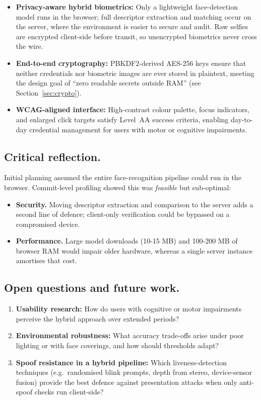\begin{itemize}
  \item \textbf{Privacy-aware hybrid biometrics:} Only a lightweight face-detection model runs in the browser; full descriptor extraction and matching occur on the server, where the environment is easier to secure and audit. Raw selfies are encrypted client-side before transit, so unencrypted biometrics never cross the wire.
  \item \textbf{End-to-end cryptography:} PBKDF2-derived AES-256 keys ensure that neither credentials nor biometric images are ever stored in plaintext, meeting the design goal of ``zero readable secrets outside RAM'' (see Section~\ref{sec:crypto}).
  \item \textbf{WCAG-aligned interface:} High-contrast colour palette, focus indicators, and enlarged click targets satisfy Level~AA success criteria, enabling day-to-day credential management for users with motor or cognitive impairments.
\end{itemize}

\subsection{Critical reflection.}
Initial planning assumed the entire face-recognition pipeline could run in the browser. Commit-level profiling showed this was \emph{feasible} but sub-optimal:  
\begin{itemize}
  \item \textbf{Security.} Moving descriptor extraction and comparison to the server adds a second line of defence; client-only verification could be bypassed on a compromised device.
  \item \textbf{Performance.} Large model downloads (10-15 MB) and 100-200 MB of browser RAM would impair older hardware, whereas a single server instance amortises that cost.
\end{itemize}


\subsection{Open questions and future work.}
\begin{enumerate}
  \item \textbf{Usability research:} How do users with cognitive or motor impairments perceive the hybrid approach over extended periods?
  \item \textbf{Environmental robustness:} What accuracy trade-offs arise under poor lighting or with face coverings, and how should thresholds adapt?
  \item \textbf{Spoof resistance in a hybrid pipeline:} Which liveness-detection techniques (e.g.\ randomised blink prompts, depth from stereo, device-sensor fusion) provide the best defence against presentation attacks when only anti-spoof checks run client-side?
\end{enumerate}

